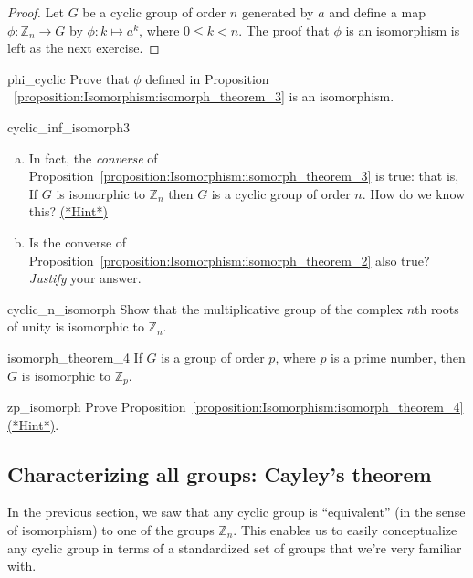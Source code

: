 \begin{proof}
Let $G$ be a cyclic group of order $n$ generated by $a$ and define a map $\phi : {\mathbb Z}_n \rightarrow  G$ by $\phi : k \mapsto a^k$, where $0 \leq k < n$. The proof that $\phi$ is an isomorphism is left as the next exercise. 
\end{proof}

\begin{exercise}{phi_cyclic}
Prove that $\phi$ defined in Proposition ~\ref{proposition:Isomorphism:isomorph_theorem_3} is an isomorphism.
\end{exercise}

\begin{exercise}{cyclic_inf_isomorph3}
\begin{enumerate}[(a)]
\item
In fact, the \emph{converse} of Proposition~\ref{proposition:Isomorphism:isomorph_theorem_3} is true: that is,   If $G$ is isomorphic to ${\mathbb Z_n}$
then $G$ is a  cyclic group of order $n$.  How do we know this? \hyperref[sec:Isomorphism:hints]{(*Hint*)}
\item
Is the converse of Proposition~\ref{proposition:Isomorphism:isomorph_theorem_2} also true?  \emph{Justify} your answer.
\end{enumerate}
\end{exercise}


\begin{exercise}{cyclic_n_isomorph}
Show that the multiplicative group of the complex $n$th roots of unity is isomorphic to ${\mathbb Z}_n$.
\end{exercise} 

\begin{prop}{isomorph_theorem_4}
If $G$ is a  group of order $p$, where $p$ is a prime number, then $G$ is isomorphic to ${\mathbb Z}_p$. 
\end{prop}

\begin{exercise}{zp_isomorph}
Prove Proposition~\ref{proposition:Isomorphism:isomorph_theorem_4} \hyperref[sec:Isomorphism:hints]{(*Hint*)}.
\end{exercise}
 

\subsection{Characterizing all groups: Cayley's theorem}
 
In the previous section, we saw that any cyclic group is ``equivalent'' (in the sense of isomorphism) to one of the groups $\mathbb{Z}_n$.  This enables us to easily conceptualize any cyclic group in terms of a standardized set of  groups that we're very familiar with. 

